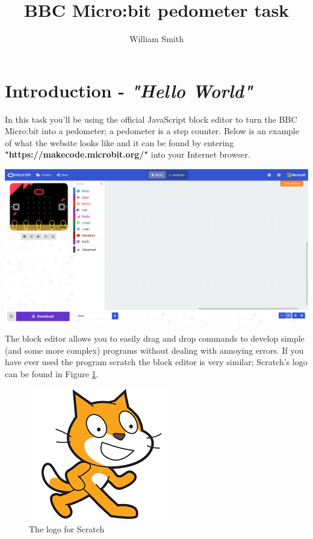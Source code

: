 \documentclass{article}
\title{\Huge{BBC Micro:bit pedometer task}}
\author{William Smith}
\begin{document}
\maketitle{}
\section{Introduction - \textit{"Hello World"}}
In this task you'll be using the official JavaScript block editor to turn the BBC Micro:bit into a pedometer; a pedometer is a step counter. Below is an example of what the website looks like and it can be found by entering \textbf{"https://makecode.microbit.org/"} into your Internet browser.
\begin{center}
	\includegraphics[scale=0.15]{blockedit}
\end{center}
The block editor allows you to easily drag and drop commands to develop simple (and some more complex) programs without dealing with annoying errors. If you have ever used the program scratch the block editor is very similar; Scratch's logo can be found in Figure \ref{fig:scratch}.
\begin{figure}
  \centering
    \includegraphics[scale=0.3]{scratch}
  \caption{The logo for Scratch}
  \label{fig:scratch}
\end{figure}
\newpage
\end{document}
